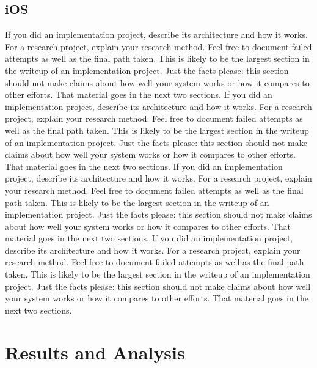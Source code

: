 \documentclass{acm_proc_article-sp}
\begin{document}
\subsection{iOS}
If you did an implementation project, describe its architecture and how it works. For a research project, explain your research method. Feel free to document failed attempts as well as the final path taken. This is likely to be the largest section in the writeup of an implementation project. Just the facts please: this section should not make claims about how well your system works or how it compares to other efforts. That material goes in the next two sections. If you did an implementation project, describe its architecture and how it works. For a research project, explain your research method. Feel free to document failed attempts as well as the final path taken. This is likely to be the largest section in the writeup of an implementation project. Just the facts please: this section should not make claims about how well your system works or how it compares to other efforts. That material goes in the next two sections. If you did an implementation project, describe its architecture and how it works. For a research project, explain your research method. Feel free to document failed attempts as well as the final path taken. This is likely to be the largest section in the writeup of an implementation project. Just the facts please: this section should not make claims about how well your system works or how it compares to other efforts. That material goes in the next two sections. If you did an implementation project, describe its architecture and how it works. For a research project, explain your research method. Feel free to document failed attempts as well as the final path taken. This is likely to be the largest section in the writeup of an implementation project. Just the facts please: this section should not make claims about how well your system works or how it compares to other efforts. That material goes in the next two sections.

\section{Results and Analysis}
\end{document}
